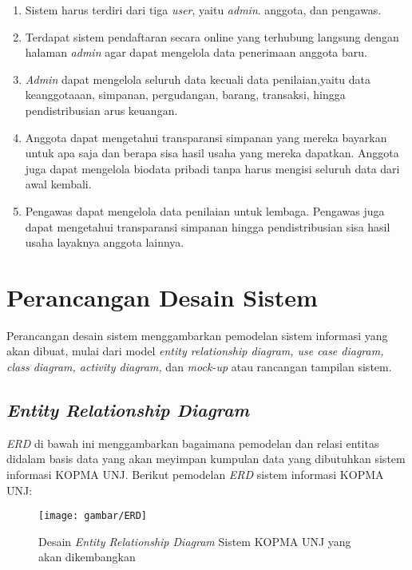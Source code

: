 \begin{enumerate}
	\item Sistem harus terdiri dari tiga \textit{user}, yaitu \textit{admin}. anggota, dan pengawas.
	\item Terdapat sistem pendaftaran secara online yang terhubung langsung dengan halaman \textit{admin} agar dapat mengelola data penerimaan anggota baru.
	\item \textit{Admin} dapat mengelola seluruh data kecuali data penilaian,yaitu data keanggotaaan, simpanan, pergudangan, barang, transaksi, hingga pendistribusian arus keuangan.
	\item Anggota dapat mengetahui transparansi simpanan yang mereka bayarkan untuk apa saja dan berapa sisa hasil usaha yang mereka dapatkan. Anggota juga dapat mengelola biodata pribadi tanpa harus mengisi seluruh data dari awal kembali.
	\item Pengawas dapat mengelola data penilaian untuk lembaga. Pengawas juga dapat mengetahui transparansi simpanan hingga pendistribusian sisa hasil usaha layaknya anggota lainnya.
\end{enumerate}

\section{Perancangan Desain Sistem}
Perancangan desain sistem menggambarkan pemodelan sistem informasi yang akan dibuat, mulai dari model \emph{entity relationship diagram, use case diagram, class diagram, activity diagram,} dan \emph{mock-up} atau rancangan tampilan sistem.

\subsection{\emph{Entity Relationship Diagram}}
\emph{ERD} di bawah ini menggambarkan bagaimana pemodelan dan relasi entitas didalam basis data yang akan meyimpan kumpulan data yang dibutuhkan sistem informasi KOPMA UNJ. Berikut pemodelan \emph{ERD} sistem informasi KOPMA UNJ: 

\begin{figure}[H]
	\centering
	\texttt{[image: gambar/ERD]}
	\caption{Desain \emph{Entity Relationship Diagram} Sistem KOPMA UNJ yang akan dikembangkan}
\end{figure}

